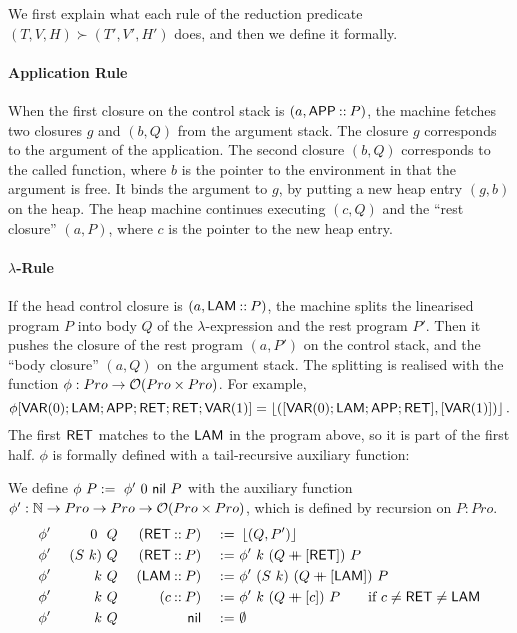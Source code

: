 We first explain what each rule of the reduction predicate $(T,V,H) \succ (T',V',H')$ does, and then we define it formally.


\paragraph{Application Rule}
When the first closure on the control stack is $(a, \mathsf{APP} \mathbin{::} P)$, the machine fetches two closures $g$ and $(b,Q)$ from the argument stack.  The
closure $g$ corresponds to the argument of the application.  The second closure $(b,Q)$ corresponds to the called function, where $b$ is the pointer
to the environment in that the argument is free.  It binds the argument to $g$, by putting a new heap entry $(g,b)$ on the heap.  The heap machine
continues executing $(c,Q)$ and the ``rest closure'' $(a,P)$, where $c$ is the pointer to the new heap entry.


\paragraph{$\lambda$-Rule}
If the head control closure is $(a, \mathsf{LAM} \mathbin{::} P)$, the machine splits the linearised program $P$ into body $Q$ of the $\lambda$-expression and
the rest program $P'$.  Then it pushes the closure of the rest program $(a,P')$ on the control stack, and the ``body closure'' $(a,Q)$ on the argument
stack.  The splitting is realised with the function $\phi : Pro \rightarrow \mathcal{O}(Pro \times Pro)$.  For example, {\small
  \[
    \phi[\mathsf{VAR}(0); \mathsf{LAM}; \mathsf{APP}; \mathsf{RET}; \mathsf{RET}; \mathsf{VAR}(1)] = \left\lfloor {([\ensuremath{\mathsf{VAR}}(0); \ensuremath{\mathsf{LAM}}; \ensuremath{\mathsf{APP}}; \ensuremath{\mathsf{RET}}], [\ensuremath{\mathsf{VAR}}(1)])} \right\rfloor.
  \]
}%
The first $\mathsf{RET}$ matches to the $\mathsf{LAM}$ in the program above, so it is part of the first half.  $\phi$ is formally defined with a
tail-recursive auxiliary function:
\begin{definition}[$\phi$][jumpTarget]
  \label{def:jumpTarget}
  We define $\phi~P :=~ \phi'~0~\mathsf{nil}~P$ with the auxiliary function $\phi' : \mathbb{N} \rightarrow Pro \rightarrow Pro \rightarrow \mathcal{O}(Pro \times Pro)$, which is defined by
  recursion on $P:Pro$.
  \begin{alignat*}{4}
    &\phi'&~0~   &~Q&~(\mathsf{RET} \mathbin{::} P) &&~:=~& \left\lfloor {(Q,P')} \right\rfloor \\
    &\phi'&~(S~k)&~Q&~(\mathsf{RET} \mathbin{::} P) &&~:=~& \phi'~k~(Q \mathbin{+\mkern-10mu+} [\mathsf{RET}])~P \\
    &\phi'&~k    &~Q&~(\mathsf{LAM} \mathbin{::} P) &&~:=~& \phi'~(S~k)~(Q \mathbin{+\mkern-10mu+} [\mathsf{LAM}])~P \\
    &\phi'&~k    &~Q&~(c        \mathbin{::} P) &&~:=~& \phi'~k~(Q \mathbin{+\mkern-10mu+} [c])~P \qquad \text{if $c \neq \mathsf{RET} \neq \mathsf{LAM}$} \\
    &\phi'&~k    &~Q&~              \mathsf{nil} &&~:=~& \emptyset
  \end{alignat*}
\end{definition}



